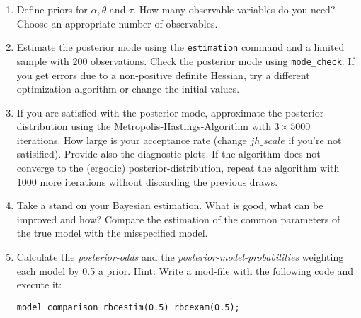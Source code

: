 \documentclass[10pt,a4paper]{article}
\begin{document}
\begin{enumerate}
  \item Define priors for $\alpha,\theta$ and $\tau$. How many observable variables do you need? Choose an appropriate number of observables.
  \item Estimate the posterior mode using the \texttt{estimation} command and a limited sample with 200 observations. Check the posterior mode using \texttt{mode\_check}. If you get errors due to a non-positive definite Hessian, try a different optimization algorithm or change the initial values.
  \item If you are satisfied with the posterior mode, approximate the posterior distribution using the Metropolis-Hastings-Algorithm with $3\times 5000$ iterations. How large is your acceptance rate (change $jh\_scale$ if you're not satisified). Provide also the diagnostic plots. If the algorithm does not converge to the (ergodic) posterior-distribution, repeat the algorithm with 1000 more iterations without discarding the previous draws.
  \item Take a stand on your Bayesian estimation. What is good, what can be improved and how? Compare the estimation of the common parameters of the true model with the misspecified model. 
  \item Calculate the \emph{posterior-odds} and the \emph{posterior-model-probabilities} weighting each model by 0.5 a prior. Hint: Write a mod-file with the following code and execute it:
\begin{verbatim}
model_comparison rbcestim(0.5) rbcexam(0.5);
\end{verbatim}
\end{enumerate}
\end{document}
